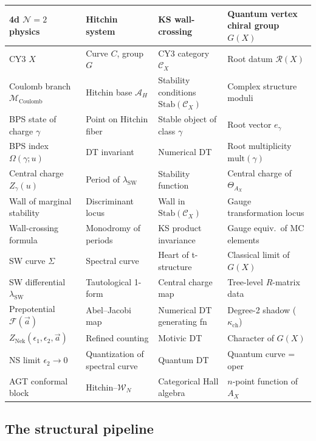 \documentclass[11pt]{article}
\theoremstyle{definition}
\theoremstyle{remark}
\newcommand{\cA}{\mathcal{A}}
\newcommand{\cC}{\mathcal{C}}
\newcommand{\cF}{\mathcal{F}}
\newcommand{\cM}{\mathcal{M}}
\newcommand{\cN}{\mathcal{N}}
\newcommand{\cW}{\mathcal{W}}
\newcommand{\SW}{\mathrm{SW}}
\newcommand{\Nek}{\mathrm{Nek}}
\newcommand{\Coulomb}{\mathrm{Coulomb}}
\begin{document}
\begin{center}
\renewcommand{\arraystretch}{1.5}
\small
\begin{tabular}{@{}p{3.7cm}p{3.3cm}p{3.1cm}p{3.5cm}@{}}
 \hline
 \textbf{4d $\cN=2$ physics} & \textbf{Hitchin system} & \textbf{KS wall-crossing} & \textbf{Quantum vertex chiral group $G(X)$} \\
 \hline
 CY3 $X$ & Curve $C$, group $G$ & CY3 category $\cC_X$ & Root datum $\mathcal{R}(X)$ \\
 Coulomb branch $\cM_{\Coulomb}$ & Hitchin base $\cA_H$ & Stability conditions $\mathrm{Stab}(\cC_X)$ & Complex structure moduli \\
 BPS state of charge $\gamma$ & Point on Hitchin fiber & Stable object of class $\gamma$ & Root vector $e_\gamma$ \\
 BPS index $\Omega(\gamma; u)$ & DT invariant & Numerical DT & Root multiplicity $\mathrm{mult}(\gamma)$ \\
 Central charge $Z_\gamma(u)$ & Period of $\lambda_{\SW}$ & Stability function & Central charge of $\Theta_{A_X}$ \\
 Wall of marginal stability & Discriminant locus & Wall in $\mathrm{Stab}(\cC_X)$ & Gauge transformation locus \\
 Wall-crossing formula & Monodromy of periods & KS product invariance & Gauge equiv.\ of MC elements \\
 SW curve $\Sigma$ & Spectral curve & Heart of t-structure & Classical limit of $G(X)$ \\
 SW differential $\lambda_{\SW}$ & Tautological 1-form & Central charge map & Tree-level $R$-matrix data \\
 Prepotential $\cF(\vec{a})$ & Abel--Jacobi map & Numerical DT generating fn & Degree-2 shadow ($\kappa_{\mathrm{ch}}$) \\
 $Z_{\Nek}(\epsilon_1,\epsilon_2,\vec{a})$ & Refined counting & Motivic DT & Character of $G(X)$ \\
 NS limit $\epsilon_2 \to 0$ & Quantization of spectral curve & Quantum DT & Quantum curve = oper \\
 AGT conformal block & Hitchin--$\cW_N$ & Categorical Hall algebra & $n$-point function of $A_X$ \\
 \hline
\end{tabular}
\end{center}

\subsection{The structural pipeline}
\label{subsec:pipeline}
\end{document}
